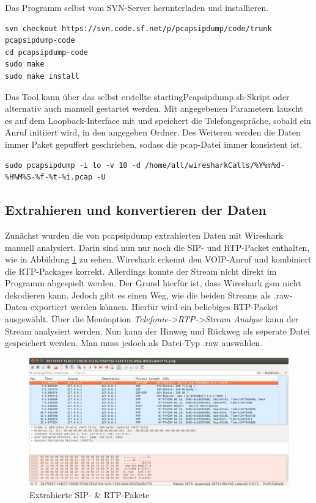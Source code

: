Das Programm selbst vom SVN-Server herunterladen und installieren.
\begin{lstlisting}
svn checkout https://svn.code.sf.net/p/pcapsipdump/code/trunk pcapsipdump-code
cd pcapsipdump-code
sudo make
sudo make install
\end{lstlisting}

Das Tool kann über das selbst erstellte startingPcapsipdump.sh-Skript oder alternativ auch manuell gestartet werden. Mit angegebenen Parametern lauscht es auf dem Loopback-Interface mit und speichert die Telefongespräche, sobald ein Anruf initiiert wird, in den angegeben Ordner. Des Weiteren werden die Daten immer Paket gepuffert geschrieben, sodass die pcap-Datei immer konsistent ist.
\begin{lstlisting}
sudo pcapsipdump -i lo -v 10 -d /home/all/wiresharkCalls/%Y%m%d-%H%M%S-%f-%t-%i.pcap -U
\end{lstlisting}

\subsection{Extrahieren und konvertieren der Daten}\label{extractData}
Zunächst wurden die von pcapsipdump extrahierten Daten mit Wireshark manuell analysiert. Darin sind nun nur noch die SIP- und RTP-Packet enthalten, wie in Abbildung \ref{fig:wSipRTP} zu sehen. Wireshark erkennt den VOIP-Anruf und kombiniert die RTP-Packages korrekt. Allerdings konnte der Stream nicht direkt im Programm abgespielt werden. Der Grund hierfür ist, dass Wireshark gsm nicht dekodieren kann.
Jedoch gibt es einen Weg, wie die beiden Streams als .raw-Daten exportiert werden können. Hierfür wird ein beliebiges RTP-Packet ausgewählt. Über die Menüoption \textit{Telefonie->RTP->Stream Analyse} kann der Stream analysiert werden. Nun kann der Hinweg und Rückweg als seperate Datei gespeichert werden. Man muss jedoch als Datei-Typ .raw auswählen.\\

\begin{figure}[h] %
\centering
\includegraphics[width=15cm]{includes/w_SIPRTP}
\caption{Extrahierte SIP- \& RTP-Pakete}
\label{fig:wSipRTP}
\end{figure}

